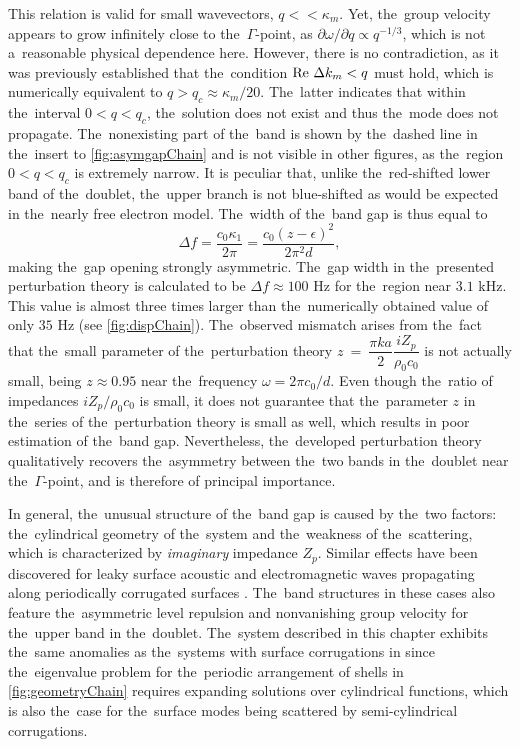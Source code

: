 This relation is valid for small wavevectors, $q << \kappa_m$.
Yet, the~group velocity appears to grow infinitely close to the~$\Gamma$-point, as $\partial \omega/ \partial q \propto q^{-1/3}$, which is not a~reasonable physical dependence here.
However, there is no contradiction, as it was previously established that the~condition $\textrm{Re }\Delta k_m < q$ must hold, which is numerically equivalent to $q>q_c \approx \kappa_m/20$.
The~latter indicates that within the~interval $0<q<q_c$, the~solution does not exist and thus the~mode does not propagate.
The~nonexisting part of the~band is shown by the~dashed line in the~insert to \cref{fig:asymgapChain} and is not visible in other figures, as the~region $0<q<q_c$ is extremely narrow.
It is peculiar that, unlike the~red-shifted lower band of the~doublet, the~upper branch is not blue-shifted as would be expected in the~nearly free electron model.
The~width of the~band gap is thus equal to
\begin{equation}
\label{eq:B20Chain}
\Delta f = \frac{c_0 \kappa_1}{2\pi} = \frac{c_0\left(z - \epsilon\right)^2}{2\pi^2 d},
\end{equation}
making the~gap opening strongly asymmetric.
The~gap width in the~presented perturbation theory is calculated to be $\Delta f \approx 100$ Hz for the~region near $3.1$ kHz.
This value is almost three times larger than the~numerically obtained value of only $35$ Hz (see \cref{fig:dispChain}).
The~observed mismatch arises from the~fact that the~small parameter of the~perturbation theory $z~=~\dfrac{\pi k a}{2}\dfrac{i Z_p}{\rho_0 c_0}$ is not actually small, being $z \approx 0.95$ near the~frequency $\omega = 2 \pi c_0/d$.
Even though the~ratio of impedances $iZ_p/\rho_0 c_0$ is small, it does not guarantee that the~parameter $z$ in the~series of the~perturbation theory is small as well, which results in poor estimation of the~band gap.
Nevertheless, the~developed perturbation theory qualitatively recovers the~asymmetry between the~two bands in the~doublet near the~$\Gamma$-point, and is therefore of principal importance.

In general, the~unusual structure of the~band gap is caused by the~two factors: the~cylindrical geometry of the~system and the~weakness of the~scattering, which is characterized by {\it imaginary} impedance $Z_p$.
Similar effects have been discovered for leaky surface acoustic and electromagnetic waves propagating along periodically corrugated surfaces \cite{maradudin2,maradudin3}.
The~band structures in these cases also feature the~asymmetric level repulsion and nonvanishing group velocity for the~upper band in the~doublet.
The~system described in this chapter exhibits the~same anomalies as the~systems with surface corrugations in \cite{maradudin2,maradudin3} since the~eigenvalue problem for the~periodic arrangement of shells in \cref{fig:geometryChain} requires expanding solutions over cylindrical functions, which is also the~case for the~surface modes being scattered by semi-cylindrical corrugations.

